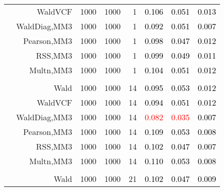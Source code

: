 \documentclass[
]{article}
\begin{document}
\begin{table}[H]
{\begin{tabular}[t]{lrrrrrrr}
\hspace{1em} & WaldVCF & 1000 & 1000 & 1 & \textcolor{black}{0.106} & \textcolor{black}{0.051} & \textcolor{black}{0.013}\\

\hspace{1em} & WaldDiag,MM3 & 1000 & 1000 & 1 & \textcolor{black}{0.092} & \textcolor{black}{0.051} & \textcolor{black}{0.007}\\

\hspace{1em} & Pearson,MM3 & 1000 & 1000 & 1 & \textcolor{black}{0.098} & \textcolor{black}{0.047} & \textcolor{black}{0.012}\\

\hspace{1em} & RSS,MM3 & 1000 & 1000 & 1 & \textcolor{black}{0.099} & \textcolor{black}{0.049} & \textcolor{black}{0.011}\\

\hspace{1em} & Multn,MM3 & 1000 & 1000 & 1 & \textcolor{black}{0.104} & \textcolor{black}{0.051} & \textcolor{black}{0.012}\\
\cmidrule{1-8}
\addlinespace[0.3em]
\multicolumn{8}{l}{\textbf{1F 15V}}\\
\hspace{1em} & Wald & 1000 & 1000 & 14 & \textcolor{black}{0.095} & \textcolor{black}{0.053} & \textcolor{black}{0.012}\\

\hspace{1em} & WaldVCF & 1000 & 1000 & 14 & \textcolor{black}{0.094} & \textcolor{black}{0.051} & \textcolor{black}{0.012}\\

\hspace{1em} & WaldDiag,MM3 & 1000 & 1000 & 14 & \textcolor{red}{0.082} & \textcolor{red}{0.035} & \textcolor{black}{0.007}\\

\hspace{1em} & Pearson,MM3 & 1000 & 1000 & 14 & \textcolor{black}{0.109} & \textcolor{black}{0.053} & \textcolor{black}{0.008}\\

\hspace{1em} & RSS,MM3 & 1000 & 1000 & 14 & \textcolor{black}{0.102} & \textcolor{black}{0.047} & \textcolor{black}{0.007}\\

\hspace{1em} & Multn,MM3 & 1000 & 1000 & 14 & \textcolor{black}{0.110} & \textcolor{black}{0.053} & \textcolor{black}{0.008}\\
\cmidrule{1-8}
\addlinespace[0.3em]
\multicolumn{8}{l}{\textbf{2F 10V}}\\
\hspace{1em} & Wald & 1000 & 1000 & 21 & \textcolor{black}{0.102} & \textcolor{black}{0.047} & \textcolor{black}{0.009}\\


\end{tabular}}
\end{table}
\end{document}
